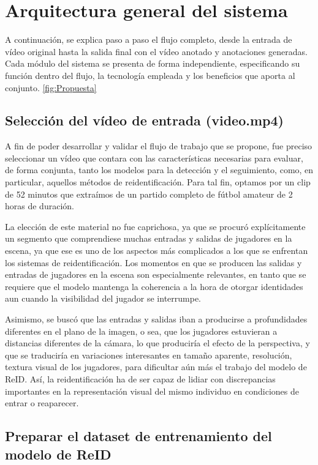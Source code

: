 \documentclass[12pt, a4paper, twoside]{article}
\begin{document}
	
	\section{Arquitectura general del sistema}
	
	A continuación, se explica paso a paso el flujo completo, desde la entrada de vídeo original hasta la salida final con el vídeo anotado y anotaciones generadas. Cada módulo del sistema se presenta de forma independiente, especificando su función dentro del flujo, la tecnología empleada y los beneficios que aporta al conjunto. \ref{fig:Propuesta}
	
	\subsection{Selección del vídeo de entrada (video.mp4)}
	
	A fin de poder desarrollar y validar el flujo de trabajo que se propone, fue preciso seleccionar un vídeo que contara con las características necesarias para evaluar, de forma conjunta, tanto los modelos para la detección y el seguimiento, como, en particular, aquellos métodos de reidentificación. Para tal fin, optamos por un clip de 52 minutos que extraímos de un partido completo de fútbol amateur de 2 horas de duración.
	
	La elección de este material no fue caprichosa, ya que se procuró explícitamente un segmento que comprendiese muchas entradas y salidas de jugadores en la escena, ya que ese es uno de los aspectos más complicados a los que se enfrentan los sistemas de reidentificación. Los momentos en que se producen las salidas y entradas de jugadores en la escena son especialmente relevantes, en tanto que se requiere que el modelo mantenga la coherencia a la hora de otorgar identidades aun cuando la visibilidad del jugador se interrumpe.
	
	Asimismo, se buscó que las entradas y salidas iban a producirse a profundidades diferentes en el plano de la imagen, o sea, que los jugadores estuvieran a distancias diferentes de la cámara, lo que produciría el efecto de la perspectiva, y que se traduciría en variaciones interesantes en tamaño aparente, resolución, textura visual de los jugadores, para dificultar aún más el trabajo del modelo de ReID. Así, la reidentificación ha de ser capaz de lidiar con discrepancias importantes en la representación visual del mismo individuo en condiciones de entrar o reaparecer.
	
	\subsection{Preparar el dataset de entrenamiento del modelo de ReID}
	
\end{document}
